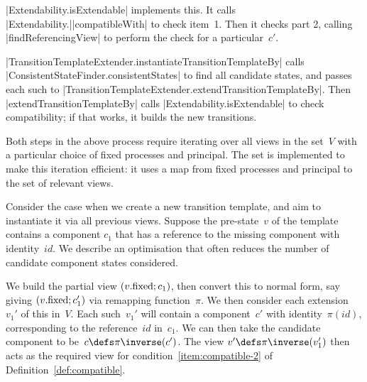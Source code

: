 
\begin{impNote}
|Extendability.isExtendable| implements this.  It calls
|Extendability.|\linebreak[1]|compatibleWith| to check item~1.  Then it checks part 2, calling
|findReferencingView| to  perform the check for a particular~$c'$. 
\end{impNote}

\begin{impNote}
|TransitionTemplateExtender.instantiateTransitionTemplateBy| calls
|ConsistentStateFinder.consistentStates| to find all candidate states, and
passes each such to |TransitionTemplateExtender.extendTransitionTemplateBy|.
Then
|extendTransitionTemplateBy| calls |Extendability.isExtendable| to check
compatibility; if that works, it builds the new transitions.
\end{impNote}

\begin{opt}
Both steps in the above process require iterating over all views in the
set~$V$ with a particular choice of fixed processes and principal.  The set is
implemented to make this iteration efficient: it uses a map from fixed
processes and principal to the set of relevant views.
\end{opt}

\begin{opt}
Consider the case when we create a new transition template, and aim to
instantiate it via all previous views.  Suppose the pre-state~$v$ of the
template contains a component $c_1$ that has a reference to the missing
component with identity~$id$.  We describe an optimisation that often reduces
the number of candidate component states considered.

We build the partial view $(v.\mathrm{fixed}; c_1)$, then convert this to normal
form, say giving $(v.\mathrm{fixed}; c_1')$ via remapping function~$\pi$.  We then
consider each extension~$v_1'$ of this in~$V$.  Each such~$v_1'$ will contain
a component~$c'$ with identity~$\pi(id)$, corresponding to the reference~$id$
in~$c_1$.  We can then take the candidate component to be~$c \defs
\pi\inverse(c')$.  The view $v' \defs \pi\inverse(v_1')$ then acts as the
required view for condition~\ref{item:compatible-2} of
Definition~\ref{def:compatible}.  
\end{opt}



